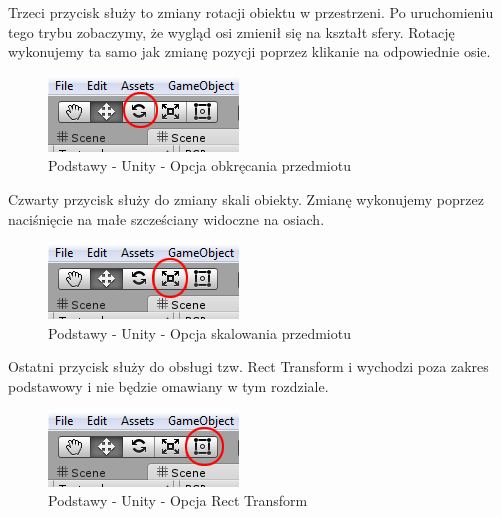 \documentclass[brudnopis]{xmgr}
\begin{document}
Trzeci przycisk służy to zmiany rotacji obiektu w przestrzeni. Po uruchomieniu tego trybu zobaczymy, że wygląd osi zmienił się na kształt sfery. Rotację wykonujemy ta samo jak zmianę pozycji poprzez klikanie na odpowiednie osie. 

\begin{figure}[!htb]
    \begin{center}
    \includegraphics[scale=0.4]{Screeny/rodzial5screeny/rotate_option}
    \end{center}
    \caption{Podstawy - Unity - Opcja obkręcania przedmiotu}
\end{figure}

Czwarty przycisk służy do zmiany skali obiekty. Zmianę wykonujemy poprzez naciśnięcie na małe szcześciany widoczne na osiach.

\begin{figure}[!htb]
    \begin{center}
    \includegraphics[scale=0.4]{Screeny/rodzial5screeny/scale_option}
    \end{center}
    \caption{Podstawy - Unity - Opcja skalowania przedmiotu}
\end{figure}

Ostatni przycisk służy do obsługi tzw. Rect Transform i wychodzi poza zakres podstawowy i nie będzie omawiany w tym rozdziale.

\begin{figure}[!htb]
    \begin{center}
    \includegraphics[scale=0.4]{Screeny/rodzial5screeny/recttrans_option}
    \end{center}
    \caption{Podstawy - Unity - Opcja Rect Transform }
\end{figure}
\end{document}
